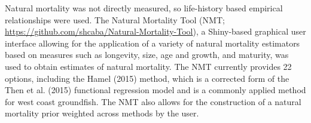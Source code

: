 \documentclass[11pt,
  english,
  a4paper,
]{article}
\begin{document}
\leavevmode\tagmcend\tagstructend


Natural mortality was not directly measured, so life-history based empirical relationships were used. The Natural Mortality Tool (NMT; {\url{https://github.com/shcaba/Natural-Mortality-Tool}\leavevmode\tagmcend\tagstructend}), a Shiny-based graphical user interface allowing for the application of a variety of natural mortality estimators based on measures such as longevity, size, age and growth, and maturity, was used to obtain estimates of natural mortality. The NMT currently provides 22 options, including the Hamel {(2015)\leavevmode\tagmcend\tagstructend} method, which is a corrected form of the Then et al. {(2015)\leavevmode\tagmcend\tagstructend} functional regression model and is a commonly applied method for west coast groundfish. The NMT also allows for the construction of a natural mortality prior weighted across methods by the user.

\leavevmode\tagmcend\tagstructend\par

\end{document}
